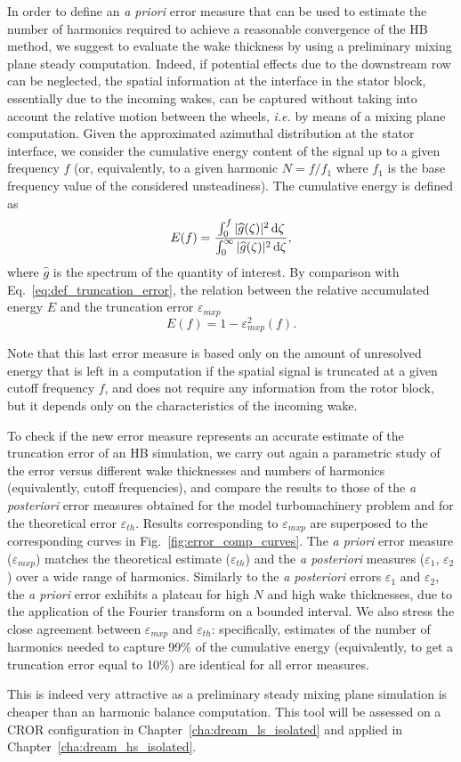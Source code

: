 In order to define an \emph{a priori} error measure 
that can be used to estimate the number of 
harmonics required to achieve a reasonable 
convergence of the HB method, we suggest to 
evaluate the wake thickness by using a preliminary 
mixing plane steady computation. Indeed, if 
potential effects due to the downstream row can 
be neglected, the spatial information at the interface 
in the stator block, essentially due to the incoming 
wakes, can be captured without taking into account 
the relative motion between the wheels, \emph{i.e.} 
by means of a mixing plane computation. 
Given the approximated azimuthal distribution at 
the stator interface, we consider the cumulative
energy content of the signal up to a given frequency $f$ 
(or, equivalently, to a given harmonic $N=f/f_1$ where $f_1$ is the
base frequency value of the considered unsteadiness). 
The cumulative energy is defined as
\begin{equation}
    E(f) = \frac{
      \int_0^f | \widehat{g}(\zeta)|^2 \mathop{}\!\mathrm{d} \zeta
    }{
      \int_0^\infty | \widehat{g}(\zeta)|^2 \mathop{}\!\mathrm{d} \zeta
    },
\end{equation}
where $\widehat{g}$ is the spectrum of the quantity of interest.
By comparison with Eq.~\eqref{eq:def_truncation_error},
the relation between the relative accumulated energy $E$
and the truncation error $\varepsilon_{mxp}$
\begin{equation}
    E(f) = 1 - \varepsilon_{mxp}^2 (f).
    \label{eq:correspond_E_error}
\end{equation}


Note that this last error measure is based only on 
the amount of unresolved energy that is left 
in a computation if the spatial signal is 
truncated at a given cutoff frequency $f$, 
and does not require any information from the rotor
block, but it depends only on the characteristics 
of the incoming wake.

To check if the new error measure represents an 
accurate estimate of the truncation error of 
an HB simulation, we carry out again a 
parametric study of the error versus different 
wake thicknesses and numbers of harmonics 
(equivalently, cutoff frequencies), and compare 
the results to those of the \emph{a posteriori} error measures 
obtained for the model turbomachinery problem and for the 
theoretical error $\varepsilon_{th}$. 
Results corresponding to $\varepsilon_{mxp}$ are 
superposed to the corresponding curves in Fig.~\ref{fig:error_comp_curves}. 
The \emph{a priori} error measure ($\varepsilon_{mxp}$) matches 
the theoretical estimate ($\varepsilon_{th}$)
and the \emph{a posteriori} measures ($\varepsilon_1$, $\varepsilon_2$)
over a wide range of harmonics. Similarly to the \emph{a posteriori}
errors $\varepsilon_1$ and $\varepsilon_2$, the \emph{a priori} error
exhibits a plateau for high $N$ and high wake thicknesses, 
due to the application of the Fourier transform on a bounded interval. 
We also stress the close agreement between 
$\varepsilon_{mxp}$ and $\varepsilon_{th}$: specifically, 
estimates of the number of harmonics needed to capture 99\% 
of the cumulative energy (equivalently, to get a 
truncation error equal to 10\%) are identical for 
all error measures.

This is indeed very attractive as a preliminary
steady mixing plane simulation is cheaper than
an harmonic balance computation. This tool
will be assessed on a CROR configuration in 
Chapter~\ref{cha:dream_ls_isolated} and applied
in Chapter~\ref{cha:dream_hs_isolated}.